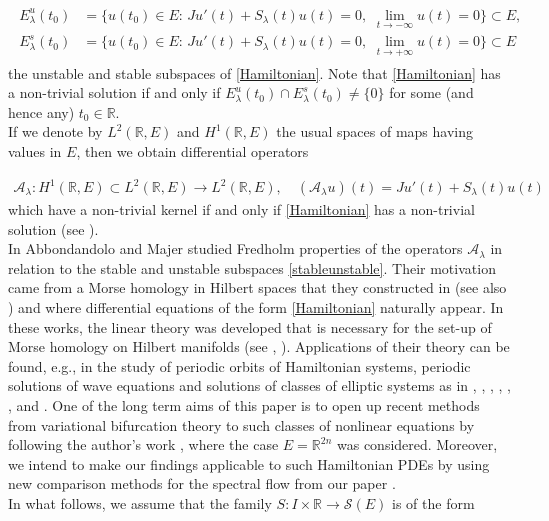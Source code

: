 \documentclass[a4paper,10pt]{article}
\begin{document}
\begin{align}\label{stableunstable}
\begin{split}
E^u_\lambda(t_0)&=\{u(t_0)\in E:\, Ju'(t)+S_\lambda(t)u(t)=0,\,\, \lim_{t\rightarrow-\infty}u(t)=0\}\subset E,\\
E^s_\lambda(t_0)&=\{u(t_0)\in E:\, Ju'(t)+S_\lambda(t)u(t)=0,\,\, \lim_{t\rightarrow+\infty}u(t)=0\}\subset E
\end{split}
\end{align}
the unstable and stable subspaces of \eqref{Hamiltonian}. Note that \eqref{Hamiltonian} has a non-trivial solution if and only if $E^u_\lambda(t_0)\cap E^s_\lambda(t_0)\neq\{0\}$ for some (and hence any) $t_0\in\mathbb{R}$.\\  
If we denote by $L^2(\mathbb{R},E)$ and $H^1(\mathbb{R},E)$ the usual spaces of maps having values in $E$, then we obtain differential operators

\begin{align}\label{A}
\mathcal{A}_\lambda:H^1(\mathbb{R},E)\subset L^2(\mathbb{R},E)\rightarrow L^2(\mathbb{R},E),\quad (\mathcal{A}_\lambda u)(t)=Ju'(t)+S_\lambda(t)u(t)
\end{align}
which have a non-trivial kernel if and only if \eqref{Hamiltonian} has a non-trivial solution (see \cite{AlbertoODE}).\\
In \cite{AlbertoODE} Abbondandolo and Majer studied Fredholm properties of the operators $\mathcal{A}_\lambda$ in relation to the stable and unstable subspaces \eqref{stableunstable}. Their motivation came from a Morse homology in Hilbert spaces that they constructed in \cite{AlbertoMorseHilbert} (see also \cite{AlbertoNotes}) and where differential equations of the form \eqref{Hamiltonian} naturally appear. In these works, the linear theory was developed that is necessary for the set-up of Morse homology on Hilbert manifolds (see \cite{AlbertoInfinite}, \cite{AlbertoManifold}). Applications of their theory can be found, e.g., in the study of periodic orbits of Hamiltonian systems, periodic solutions of wave equations and solutions of classes of elliptic systems as in \cite{AlbertoTMNA}, \cite{AlbertoNonlinear}, \cite{vanderVorst}, \cite{MarekI}, \cite{MarekII}, \cite{Kryszewski}, \cite{Maalaoui} and \cite{Szulkin}. One of the long term aims of this paper is to open up recent methods from variational bifurcation theory to such classes of nonlinear equations by following the author's work \cite{WaterstraatHomoclinics}, where the case $E=\mathbb{R}^{2n}$ was considered. Moreover, we intend to make our findings applicable to such Hamiltonian PDEs by using new comparison methods for the spectral flow from our paper \cite{Edinburgh}.\\
In what follows, we assume that the family $S:I\times\mathbb{R}\rightarrow\mathcal{S}(E)$ is of the form
\end{document}
